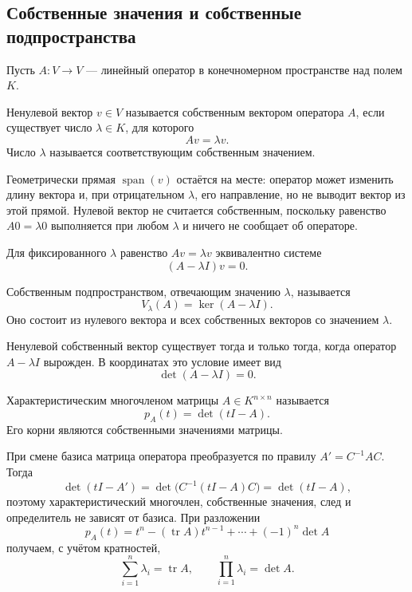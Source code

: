 \subsection{Собственные значения и собственные подпространства}

Пусть $A\colon V\to V$ --- линейный оператор в конечномерном пространстве над полем $K$.

\begin{definition}
Ненулевой вектор $v\in V$ называется собственным вектором оператора $A$, если существует число $\lambda\in K$, для которого
\[
Av=\lambda v.
\]
Число $\lambda$ называется соответствующим собственным значением.
\end{definition}

Геометрически прямая $\operatorname{span}(v)$ остаётся на месте: оператор может изменить длину вектора и, при отрицательном $\lambda$, его направление, но не выводит вектор из этой прямой. Нулевой вектор не считается собственным, поскольку равенство $A0=\lambda0$ выполняется при любом $\lambda$ и ничего не сообщает об операторе.

Для фиксированного $\lambda$ равенство $Av=\lambda v$ эквивалентно системе
\[
(A-\lambda I)v=0.
\]

\begin{definition}
Собственным подпространством, отвечающим значению $\lambda$, называется
\[
V_\lambda(A)=\ker(A-\lambda I).
\]
Оно состоит из нулевого вектора и всех собственных векторов со значением $\lambda$.
\end{definition}

Ненулевой собственный вектор существует тогда и только тогда, когда оператор $A-\lambda I$ вырожден. В координатах это условие имеет вид
\[
\det(A-\lambda I)=0.
\]

\begin{definition}
Характеристическим многочленом матрицы $A\in K^{n\times n}$ называется
\[
p_A(t)=\det(tI-A).
\]
Его корни являются собственными значениями матрицы.
\end{definition}

При смене базиса матрица оператора преобразуется по правилу $A'=C^{-1}AC$. Тогда
\[
\det(tI-A')
=
\det\bigl(C^{-1}(tI-A)C\bigr)
=
\det(tI-A),
\]
поэтому характеристический многочлен, собственные значения, след и определитель не зависят от базиса. При разложении
\[
p_A(t)=t^n-(\operatorname{tr}A)t^{n-1}+\cdots+(-1)^n\det A
\]
получаем, с учётом кратностей,
\[
\sum_{i=1}^{n}\lambda_i=\operatorname{tr}A,
\qquad
\prod_{i=1}^{n}\lambda_i=\det A.
\]

